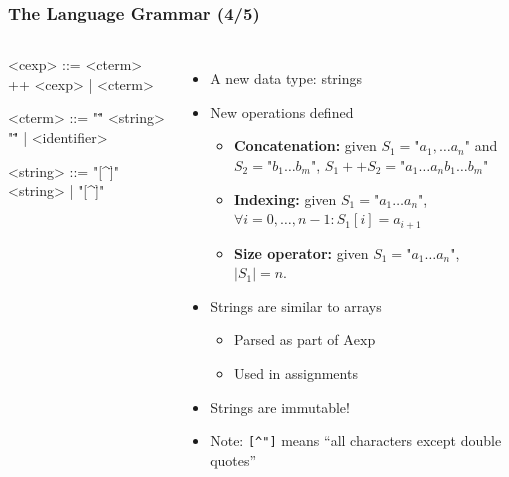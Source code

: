 \documentclass{beamer}
\begin{document}
\begin{frame}[fragile]
	\footnotesize
	\frametitle{The Language Grammar (4/5)}
	\begin{columns}
		\begin{grammar}
			<cexp> ::= <cterm> ++ <cexp> | <cterm>

			<cterm> ::= "\"" <string> "\"" | <identifier>

			<string> ::= "[^\"]" <string> | "[^\"]"
		\end{grammar}

		\begin{itemize}
			\item A new data type: strings
			\item New operations defined
				\begin{itemize}
					\footnotesize
					\item \textbf{Concatenation:} given $S_1=\texttt{"}
						a_1,\ldots a_n\texttt{"}$ and $S_2 = \texttt{"}
						b_1\ldots b_m\texttt{"}$, $S_1++S_2=\texttt{"}a_1\ldots
						a_n b_1 \ldots b_m\texttt{"}$
					\item \textbf{Indexing:} given $S_1=\texttt{"} a_1\ldots
						a_n\texttt{"}$, $\forall i = 0,\ldots, n-1: S_1[i] =
						a_{i+1}$
					\item \textbf{Size operator:} given $S_1=\texttt{"}
						a_1\ldots a_n\texttt{"}$, $|S_1|=n$.
				\end{itemize}
			\item Strings are similar to arrays
				\begin{itemize}
					\footnotesize
					\item Parsed as part of $\mathrm{Aexp}$
					\item Used in assignments
				\end{itemize}
			\item Strings are immutable!
			\item Note: \texttt{[\^{}"]} means ``all characters except double
				quotes''
		\end{itemize}
	\end{columns}
\end{frame}
\end{document}
